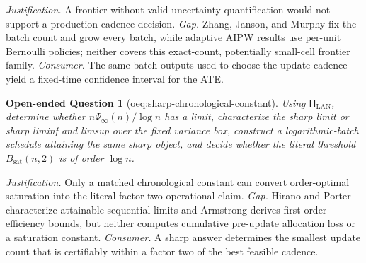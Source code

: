 \documentclass{article}
\newtheorem{openendedquestion}{Open-ended Question}
\begin{document}
\par\smallskip\noindent \textit{Justification.} A frontier without valid uncertainty quantification would not support a production cadence decision. \textit{Gap.} Zhang, Janson, and Murphy fix the batch count and grow every batch, while adaptive AIPW results use per-unit Bernoulli policies; neither covers this exact-count, potentially small-cell frontier family. \textit{Consumer.} The same batch outputs used to choose the update cadence yield a fixed-time confidence interval for the ATE.

\begin{openendedquestion}[oeq:sharp-chronological-constant]\label{oeq:sharp-chronological-constant}
Using \(\mathsf H_{\mathrm{LAN}}\), determine whether \(n\Psi_\infty(n)/\log n\) has a limit, characterize the sharp limit or sharp liminf and limsup over the fixed variance box, construct a logarithmic-batch schedule attaining the same sharp object, and decide whether the literal threshold \(B_{\mathrm{sat}}(n,2)\) is of order \(\log n\).
\end{openendedquestion}
\par\smallskip\noindent \textit{Justification.} Only a matched chronological constant can convert order-optimal saturation into the literal factor-two operational claim. \textit{Gap.} Hirano and Porter characterize attainable sequential limits and Armstrong derives first-order efficiency bounds, but neither computes cumulative pre-update allocation loss or a saturation constant. \textit{Consumer.} A sharp answer determines the smallest update count that is certifiably within a factor two of the best feasible cadence.
\end{document}
